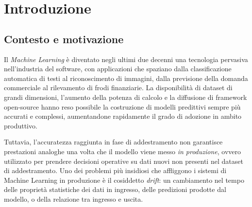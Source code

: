 
\chapter{Introduzione}
\label{ch:introduzione}

\section{Contesto e motivazione}
\label{sec:contesto-motivazione}

Il \textit{Machine Learning} è diventato negli ultimi due decenni una tecnologia
pervasiva nell'industria del software, con applicazioni che spaziano dalla
classificazione automatica di testi al riconoscimento di immagini, dalla
previsione della domanda commerciale al rilevamento di frodi finanziarie. La
disponibilità di dataset di grandi dimensioni, l'aumento della potenza di calcolo
e la diffusione di framework open-source hanno reso possibile la costruzione di
modelli predittivi sempre più accurati e complessi, aumentandone rapidamente il
grado di adozione in ambito produttivo.

Tuttavia, l'accuratezza raggiunta in fase di addestramento non garantisce
prestazioni analoghe una volta che il modello viene messo \textit{in produzione},
ovvero utilizzato per prendere decisioni operative su dati nuovi non presenti nel
dataset di addestramento. Uno dei problemi più insidiosi che affliggono i sistemi
di Machine Learning in produzione è il cosiddetto \textit{drift}: un
cambiamento nel tempo delle proprietà statistiche dei dati in ingresso, delle
predizioni prodotte dal modello, o della relazione tra ingresso e uscita.

